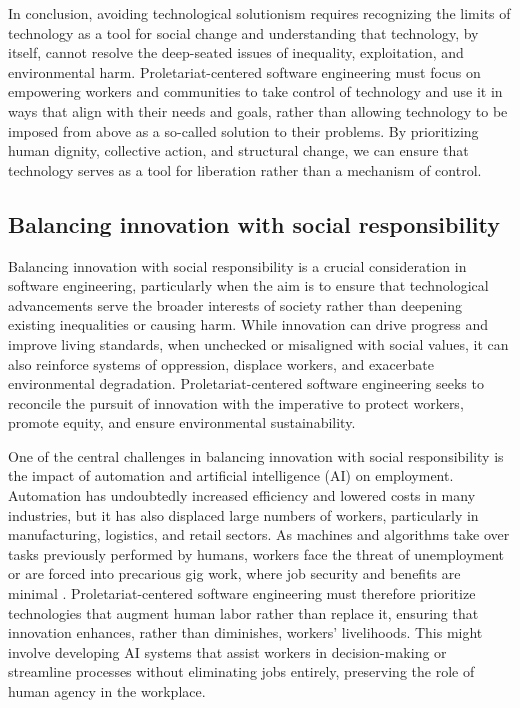 \begin{refsection}
In conclusion, avoiding technological solutionism requires recognizing the limits of technology as a tool for social change and understanding that technology, by itself, cannot resolve the deep-seated issues of inequality, exploitation, and environmental harm. Proletariat-centered software engineering must focus on empowering workers and communities to take control of technology and use it in ways that align with their needs and goals, rather than allowing technology to be imposed from above as a so-called solution to their problems. By prioritizing human dignity, collective action, and structural change, we can ensure that technology serves as a tool for liberation rather than a mechanism of control.

\subsection{Balancing innovation with social responsibility}

Balancing innovation with social responsibility is a crucial consideration in software engineering, particularly when the aim is to ensure that technological advancements serve the broader interests of society rather than deepening existing inequalities or causing harm. While innovation can drive progress and improve living standards, when unchecked or misaligned with social values, it can also reinforce systems of oppression, displace workers, and exacerbate environmental degradation. Proletariat-centered software engineering seeks to reconcile the pursuit of innovation with the imperative to protect workers, promote equity, and ensure environmental sustainability.

One of the central challenges in balancing innovation with social responsibility is the impact of automation and artificial intelligence (AI) on employment. Automation has undoubtedly increased efficiency and lowered costs in many industries, but it has also displaced large numbers of workers, particularly in manufacturing, logistics, and retail sectors. As machines and algorithms take over tasks previously performed by humans, workers face the threat of unemployment or are forced into precarious gig work, where job security and benefits are minimal \cite[pp.~140-142]{brynjolfsson2017}. Proletariat-centered software engineering must therefore prioritize technologies that augment human labor rather than replace it, ensuring that innovation enhances, rather than diminishes, workers' livelihoods. This might involve developing AI systems that assist workers in decision-making or streamline processes without eliminating jobs entirely, preserving the role of human agency in the workplace.


\end{refsection}
